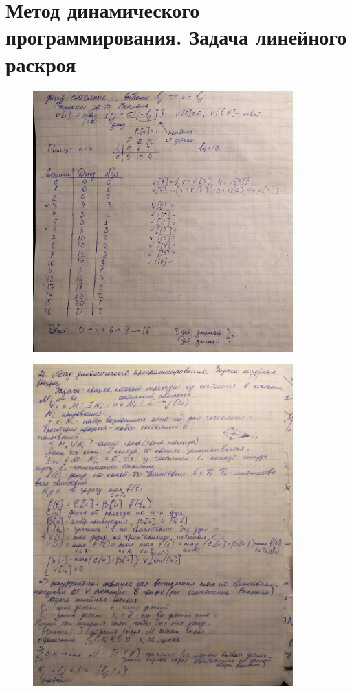 \documentclass[discrete.tex]{subfiles}
\begin{document}
  \section{Метод динамического программирования. Задача линейного раскроя}

  \begin{figure}[H]
          \includegraphics[width=10cm]{pics/54_1}
          \centering
  \end{figure}

  \begin{figure}[H]
          \includegraphics[width=10cm]{pics/54_2}
          \centering
  \end{figure}
\end{document}
